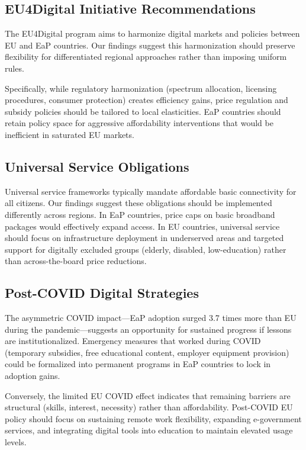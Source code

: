 \documentclass[12pt,review]{elsarticle}
\begin{document}
\subsection{EU4Digital Initiative Recommendations}

The EU4Digital program aims to harmonize digital markets and policies between EU and EaP countries. Our findings suggest this harmonization should preserve flexibility for differentiated regional approaches rather than imposing uniform rules.

Specifically, while regulatory harmonization (spectrum allocation, licensing procedures, consumer protection) creates efficiency gains, price regulation and subsidy policies should be tailored to local elasticities. EaP countries should retain policy space for aggressive affordability interventions that would be inefficient in saturated EU markets.

\subsection{Universal Service Obligations}

Universal service frameworks typically mandate affordable basic connectivity for all citizens. Our findings suggest these obligations should be implemented differently across regions. In EaP countries, price caps on basic broadband packages would effectively expand access. In EU countries, universal service should focus on infrastructure deployment in underserved areas and targeted support for digitally excluded groups (elderly, disabled, low-education) rather than across-the-board price reductions.

\subsection{Post-COVID Digital Strategies}

The asymmetric COVID impact—EaP adoption surged 3.7 times more than EU during the pandemic—suggests an opportunity for sustained progress if lessons are institutionalized. Emergency measures that worked during COVID (temporary subsidies, free educational content, employer equipment provision) could be formalized into permanent programs in EaP countries to lock in adoption gains.

Conversely, the limited EU COVID effect indicates that remaining barriers are structural (skills, interest, necessity) rather than affordability. Post-COVID EU policy should focus on sustaining remote work flexibility, expanding e-government services, and integrating digital tools into education to maintain elevated usage levels.
\end{document}
